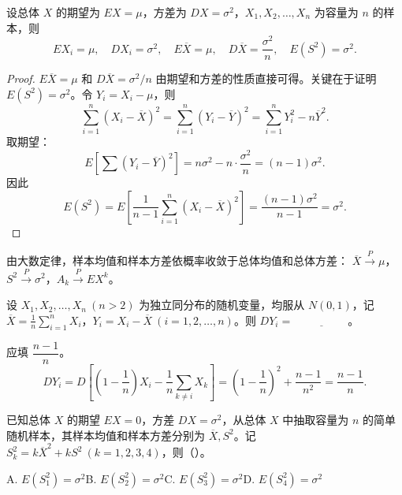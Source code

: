 \documentclass[lang=cn,11pt]{elegantbook}
\begin{document}
\begin{property}[统计量的数字特征] \label{prop:stat-moment}
设总体 \(X\) 的期望为 \(EX = \mu\)，方差为 \(DX = \sigma^2\)，\(X_1, X_2, \dots, X_n\) 为容量为 \(n\) 的样本，则
\[
EX_i = \mu,\quad DX_i = \sigma^2,\quad E\overline{X} = \mu,\quad D\overline{X} = \frac{\sigma^2}{n},\quad E(S^2) = \sigma^2.
\]
\end{property}
\begin{proof}
\(E\overline{X} = \mu\) 和 \(D\overline{X} = \sigma^2/n\) 由期望和方差的性质直接可得。关键在于证明 \(E(S^2) = \sigma^2\)。令 \(Y_i = X_i - \mu\)，则
\[
\sum_{i=1}^{n}(X_i - \overline{X})^2 = \sum_{i=1}^{n}(Y_i - \overline{Y})^2 = \sum_{i=1}^{n} Y_i^2 - n\overline{Y}^2.
\]
取期望：
\[
E\!\left[\sum(Y_i - \overline{Y})^2\right] = n\sigma^2 - n\cdot\frac{\sigma^2}{n} = (n-1)\sigma^2.
\]
因此
\[
E(S^2) = E\!\left[\frac{1}{n-1}\sum_{i=1}^{n}(X_i-\overline{X})^2\right] = \frac{(n-1)\sigma^2}{n-1} = \sigma^2.
\]
\end{proof}

\begin{note}
由大数定律，样本均值和样本方差依概率收敛于总体均值和总体方差：
\(\overline{X} \stackrel{P}{\longrightarrow} \mu\)，\(S^2 \stackrel{P}{\longrightarrow} \sigma^2\)，\(A_k \stackrel{P}{\longrightarrow} EX^k\)。
\end{note}

\begin{exercise}\label{exer:6-yi-var}
设 \(X_1, X_2, \dots, X_n\ (n > 2)\) 为独立同分布的随机变量，均服从 \(N(0,1)\)，记 \(\overline{X} = \frac{1}{n}\sum_{i=1}^{n}X_i\)，\(Y_i = X_i - \overline{X}\ (i=1,2,\dots,n)\)。则 \(DY_i =\,\underline{\hspace{2cm}}\)。
\end{exercise}

\begin{solution}
应填 \(\dfrac{n-1}{n}\)。
\[
DY_i = D\!\left[\!\left(1-\frac{1}{n}\right)X_i - \frac{1}{n}\sum_{k \neq i}X_k\right] = \left(1-\frac{1}{n}\right)^{\!2} + \frac{n-1}{n^2} = \frac{n-1}{n}.
\]
\end{solution}

\begin{exercise}\label{exer:6-sk-sq}
已知总体 \(X\) 的期望 \(EX = 0\)，方差 \(DX = \sigma^2\)，从总体 \(X\) 中抽取容量为 \(n\) 的简单随机样本，其样本均值和样本方差分别为 \(\overline{X}, S^2\)。记 \(S_k^2 = k\overline{X}^2 + kS^2\ (k=1,2,3,4)\)，则（\quad）。\par
A. \(E(S_1^2) = \sigma^2\)\quad B. \(E(S_2^2) = \sigma^2\)\quad C. \(E(S_3^2) = \sigma^2\)\quad D. \(E(S_4^2) = \sigma^2\)
\end{exercise}
\end{document}
